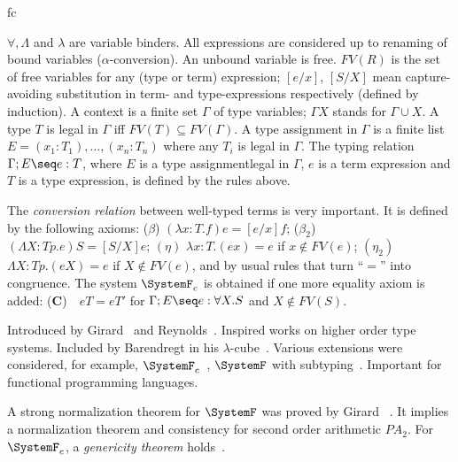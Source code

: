 \begin{entry}{fc}
\begin{clarifications}
$\forall, \Lambda$ and $\lambda$ are variable binders. All expressions are considered up to renaming of bound variables
($\alpha$-conversion). An unbound variable is free. $FV(R)$ is the set of free
variables for any (type or term) expression; $[e/x]$, $[S/X]$ mean capture-avoiding substitution in term- and type-expressions respectively (defined by induction). 
A context is a finite set $\Gamma$ of type variables; $\Gamma X$ stands for $\Gamma\cup{X}$. A type $T$ is legal in $\Gamma$ iff 
$FV(T)\subseteq FV(\Gamma)$. A type assignment in $\Gamma$ is a finite list
$E = (x_1:T_1),..., (x_n:T_n)$ where any $T_i$ is legal in $\Gamma$. 
The typing
relation $\Gamma; E\seq e:T$, where $E$ is a type assignmentlegal in $\Gamma$,
$e$ is a term expression and $T$ is a type expression, is defined by the rules
above.

The {\em conversion relation} between well-typed 
terms is very important. It is defined
by the following axioms: ($\beta$) $(\lambda x:T.f)e = [e/x]f$; 
($\beta_2$) $(\Lambda X:Tp.e)S=[S/X]e$; $(\eta)$ $\lambda x:T.(ex)=e$ if 
$x\notin FV(e)$; $(\eta_2)$ $\Lambda X:Tp.(eX) = e$ if 
$X\notin FV(e)$, and by usual rules that turn ``$=$'' into congruence.
The system $\SystemF_c$ is obtained if one more equality axiom is added:
({\bf C})\,\,\,\, $eT = eT'$ for $\Gamma; E\seq e:\forall X.S$ and $X\notin FV(S)$.
	\end{clarifications}
	
	\begin{history}
Introduced by Girard~\cite{Gir:71} and Reynolds~\cite{Rey:74}. Inspired works on higher order type systems. Included by Barendregt in his $\lambda$-cube~\cite{Bar:91}. Various extensions were considered, for example, $\SystemF_c$~\cite{LMS:93}, $\SystemF$ with subtyping~\cite{CMMS:91, LMS:00}. Important for functional programming languages.
	\end{history}
	
	\begin{technicalities}
A strong normalization theorem for $\SystemF$ was proved by Girard
~\cite{Gir:72}. It implies a normalization theorem and consistency for second
order arithmetic $PA_2$. For $\SystemF_c$, a {\em genericity theorem} holds~\cite{LMS:93}.
	\end{technicalities}
	

\end{entry}
